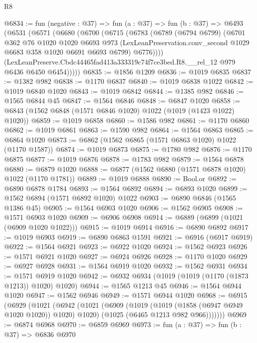 \begin{lexlean}{R8}
\begin{coremodule}
@6834 := fun (negative : @37) =>
  fun (a : @37) =>
  fun (b : @37) =>
  @6493
    (@6531
      (@6571
        (@6680
          (@6700
            (@6715
              (@6783
                (@6789
                  (@6794 @6799)
                  (@6701
                    @362
                    @76
                    @1020
                    @1020
                    @6693
                    @973
                    (LexLeanPreservation.conv_second @1029 @6683 @358 @1020 @6691 @6693 @6799)
                    @6776))))
            (LexLeanPreserve.Cbdc44465fad413a333319c74f7ce3bed.R8.__rel_12
              @979
              @6436
              @6450
              @6454)))))
@6835 := @1856 @1209
@6836 := @1019 @6835
@6837 := @1382 @982
@6838 := @1170 @6837
@6840 := @1019 @6838 @1022
@6842 := @1019 @6840 @1020
@6843 := @1019 @6842
@6844 := @1385 @982
@6846 := @1565 @6844 @45
@6847 := @1564 @6846
@6848 := @6847 @1020
@6858 := @6843 (@1562 @6848 (@1571 @6846 @1020) @1022 (@1019 (@1423 @1022) @1020))
@6859 := @1019 @6858
@6860 := @1586 @982
@6861 := @1170 @6860
@6862 := @1019 @6861
@6863 := @1590 @982
@6864 := @1564 @6863
@6865 := @6864 @1020
@6873 := @6862 (@1562 @6865 (@1571 @6863 @1020) @1022 (@1170 @1587))
@6874 := @1019 @6873
@6875 := @1780 @982
@6876 := @1170 @6875
@6877 := @1019 @6876
@6878 := @1783 @982
@6879 := @1564 @6878
@6880 := @6879 @1020
@6888 := @6877 (@1562 @6880 (@1571 @6878 @1020) @1022 (@1170 @1781))
@6889 := @1019 @6888
@6890 := Bool.or
@6892 := @6890 @6878 @1784
@6893 := @1564 @6892
@6894 := @6893 @1020
@6899 := @1562 @6894 (@1571 @6892 @1020) @1022
@6903 := @6890 @6846 (@1565 @1386 @45)
@6905 := @1564 @6903 @1020
@6906 := @1562 @6905
@6908 := @1571 @6903 @1020
@6909 := @6906 @6908
@6914 := @6889 (@6899 (@1021 (@6909 @1020 @1022)))
@6915 := @1019 @6914
@6916 := @6890 @6892
@6917 := @1019 @6903
@6919 := @6890 @6863 @1591
@6921 := @6916 (@6917 @6919)
@6922 := @1564 @6921
@6923 := @6922 @1020
@6924 := @1562 @6923
@6926 := @1571 @6921 @1020
@6927 := @6924 @6926
@6928 := @1170 @1020
@6929 := @6927 @6928
@6931 := @1564 @6919 @1020
@6932 := @1562 @6931
@6934 := @1571 @6919 @1020
@6942 := @6932 @6934 (@1019 (@1019 (@1170 (@1873 @1213)) @1020) @1020)
@6944 := @1565 @1213 @45
@6946 := @1564 @6944 @1020
@6947 := @1562 @6946
@6949 := @1571 @6944 @1020
@6968 := @6915
    (@6929
      (@1021
        (@6942
          (@1021
            (@6909
              (@1019 (@1019 (@1858 (@6947 @6949 @1020 @1020)) @1020) @1020)
              (@1025 (@6465 @1213 @982 @966)))))))
@6969 := @6874 @6968
@6970 := @6859 @6969
@6973 := fun (a : @37) => fun (b : @37) => @6836 @6970

\end{coremodule}
\end{lexlean}
